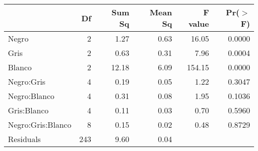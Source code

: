\begin{table}[ht]
\centering
\begin{tabular}{lrrrrr}
  \hline
 & Df & Sum Sq & Mean Sq & F value & Pr($>$F) \\ 
  \hline
Negro             & 2 & 1.27 & 0.63 & 16.05 & 0.0000 \\ 
  Gris              & 2 & 0.63 & 0.31 & 7.96 & 0.0004 \\ 
  Blanco            & 2 & 12.18 & 6.09 & 154.15 & 0.0000 \\ 
  Negro:Gris        & 4 & 0.19 & 0.05 & 1.22 & 0.3047 \\ 
  Negro:Blanco      & 4 & 0.31 & 0.08 & 1.95 & 0.1036 \\ 
  Gris:Blanco       & 4 & 0.11 & 0.03 & 0.70 & 0.5960 \\ 
  Negro:Gris:Blanco & 8 & 0.15 & 0.02 & 0.48 & 0.8729 \\ 
  Residuals         & 243 & 9.60 & 0.04 &  &  \\ 
   \hline
\end{tabular}
\end{table}
